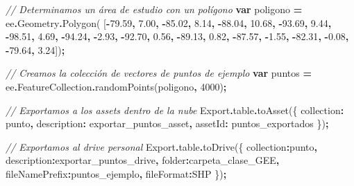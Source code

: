 \documentclass[
  12pt,
  letterpaper,
  twoside]{book}
\newenvironment{Shaded}{\begin{snugshade}}{\end{snugshade}}
\newcommand{\AttributeTok}[1]{\textcolor[rgb]{0.77,0.63,0.00}{#1}}
\newcommand{\CommentTok}[1]{\textcolor[rgb]{0.56,0.35,0.01}{\textit{#1}}}
\newcommand{\DataTypeTok}[1]{\textcolor[rgb]{0.13,0.29,0.53}{#1}}
\newcommand{\DecValTok}[1]{\textcolor[rgb]{0.00,0.00,0.81}{#1}}
\newcommand{\FloatTok}[1]{\textcolor[rgb]{0.00,0.00,0.81}{#1}}
\newcommand{\FunctionTok}[1]{\textcolor[rgb]{0.00,0.00,0.00}{#1}}
\newcommand{\KeywordTok}[1]{\textcolor[rgb]{0.13,0.29,0.53}{\textbf{#1}}}
\newcommand{\NormalTok}[1]{#1}
\newcommand{\OperatorTok}[1]{\textcolor[rgb]{0.81,0.36,0.00}{\textbf{#1}}}
\newcommand{\StringTok}[1]{\textcolor[rgb]{0.31,0.60,0.02}{#1}}
\begin{document}
\begin{Shaded}
\begin{Highlighting}[]
\CommentTok{// Determinamos un área de estudio con un polígono}
\KeywordTok{var}\NormalTok{ poligono }\OperatorTok{=}\NormalTok{ ee}\OperatorTok{.}\AttributeTok{Geometry}\OperatorTok{.}\FunctionTok{Polygon}\NormalTok{(}
\NormalTok{        [}\OperatorTok{{-}}\FloatTok{79.59}\OperatorTok{,} \FloatTok{7.00}\OperatorTok{,}
          \OperatorTok{{-}}\FloatTok{85.02}\OperatorTok{,} \FloatTok{8.14}\OperatorTok{,}
          \OperatorTok{{-}}\FloatTok{88.04}\OperatorTok{,} \FloatTok{10.68}\OperatorTok{,}
          \OperatorTok{{-}}\FloatTok{93.69}\OperatorTok{,} \FloatTok{9.44}\OperatorTok{,}
          \OperatorTok{{-}}\FloatTok{98.51}\OperatorTok{,} \FloatTok{4.69}\OperatorTok{,}
          \OperatorTok{{-}}\FloatTok{94.24}\OperatorTok{,} \OperatorTok{{-}}\FloatTok{2.93}\OperatorTok{,}
          \OperatorTok{{-}}\FloatTok{92.70}\OperatorTok{,} \FloatTok{0.56}\OperatorTok{,}
          \OperatorTok{{-}}\FloatTok{89.13}\OperatorTok{,} \FloatTok{0.82}\OperatorTok{,}
          \OperatorTok{{-}}\FloatTok{87.57}\OperatorTok{,} \OperatorTok{{-}}\FloatTok{1.55}\OperatorTok{,}
          \OperatorTok{{-}}\FloatTok{82.31}\OperatorTok{,} \OperatorTok{{-}}\FloatTok{0.08}\OperatorTok{,}
          \OperatorTok{{-}}\FloatTok{79.64}\OperatorTok{,} \FloatTok{3.24}\NormalTok{])}\OperatorTok{;}

\CommentTok{// Creamos la colección de vectores de puntos de ejemplo}
\KeywordTok{var}\NormalTok{ puntos }\OperatorTok{=}\NormalTok{ ee}\OperatorTok{.}\AttributeTok{FeatureCollection}\OperatorTok{.}\FunctionTok{randomPoints}\NormalTok{(poligono}\OperatorTok{,} \DecValTok{4000}\NormalTok{)}\OperatorTok{;}

\CommentTok{// Exportamos a los assets dentro de la nube}
\NormalTok{Export}\OperatorTok{.}\AttributeTok{table}\OperatorTok{.}\FunctionTok{toAsset}\NormalTok{(\{}
  \DataTypeTok{collection}\OperatorTok{:}\NormalTok{ punto}\OperatorTok{,}
  \DataTypeTok{description}\OperatorTok{:} \StringTok{\textquotesingle{}exportar\_puntos\_asset\textquotesingle{}}\OperatorTok{,}
  \DataTypeTok{assetId}\OperatorTok{:} \StringTok{\textquotesingle{}puntos\_exportados\textquotesingle{}}
\NormalTok{\})}\OperatorTok{;}

\CommentTok{// Exportamos al drive personal}
\NormalTok{Export}\OperatorTok{.}\AttributeTok{table}\OperatorTok{.}\FunctionTok{toDrive}\NormalTok{(\{}
  \DataTypeTok{collection}\OperatorTok{:}\NormalTok{punto}\OperatorTok{,} 
  \DataTypeTok{description}\OperatorTok{:}\StringTok{\textquotesingle{}exportar\_puntos\_drive\textquotesingle{}}\OperatorTok{,}
  \DataTypeTok{folder}\OperatorTok{:}\StringTok{\textquotesingle{}carpeta\_clase\_GEE\textquotesingle{}}\OperatorTok{,}
  \DataTypeTok{fileNamePrefix}\OperatorTok{:}\StringTok{\textquotesingle{}puntos\_ejemplo\textquotesingle{}}\OperatorTok{,}
  \DataTypeTok{fileFormat}\OperatorTok{:}\StringTok{\textquotesingle{}SHP\textquotesingle{}}
\NormalTok{\})}\OperatorTok{;}
\end{Highlighting}
\end{Shaded}
\end{document}
